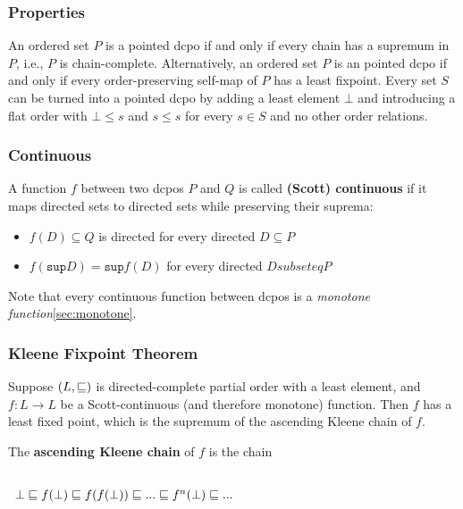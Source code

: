 \subsubsection{Properties}

An ordered set $P$ is a pointed dcpo if and only if every chain has a
supremum in $P$, i.e., $P$ is chain-complete. Alternatively, an
ordered set $P$ is an pointed dcpo if and only if every
order-preserving self-map of $P$ has a least fixpoint. Every set $S$
can be turned into a pointed dcpo by adding a least element $\bot$ and
introducing a flat order with $\bot \leq s$ and $s \leq s$ for every
$s \in S$ and no other order relations.


\subsubsection{Continuous}
\label{sec:scott-continuous}

A function $f$ between two dcpos $P$ and $Q$ is called \textbf{(Scott)
  continuous} if it maps directed sets to directed sets while
preserving their suprema:

\begin{itemize}
\item $f(D) \subseteq Q$ is directed for every directed $D \subseteq P$
\item $f(\mathtt{sup}D) = \mathtt{sup} f(D)$ for every directed $D subseteq P$
\end{itemize}

Note that every continuous function between dcpos is a
\textit{monotone function}\ref{sec:monotone}.


\subsubsection{Kleene Fixpoint Theorem}
\label{sec:fixpoint-theorem}

Suppose $(L, \sqsubseteq)$ is directed-complete partial order with a least
element, and $f: L \to L$ be a Scott-continuous (and therefore
monotone) function. Then $f$ has a least fixed point, which is the
supremum of the ascending Kleene chain of $f$.

The \textbf{ascending Kleene chain} of $f$ is the chain

\begin{math}
  \begin{array}{c}
    \\
    \bot \sqsubseteq f(\bot) \sqsubseteq f(f(\bot)) \sqsubseteq ... \sqsubseteq f^n(\bot) \sqsubseteq ...\\
    \\
  \end{array}
\end{math}

